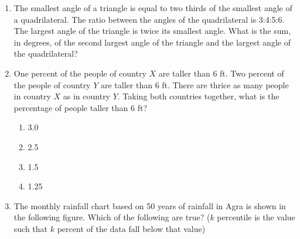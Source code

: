 \documentclass[journal,12pt,onecolumn]{IEEEtran}
\theoremstyle{remark}
\begin{document}
\begin{enumerate}
\item The smallest angle of a triangle is equal to two thirds of the smallest angle of a quadrilateral. The ratio between the angles of the quadrilateral is 3:4:5:6. The largest angle of the triangle is twice its smallest angle. What is the sum, in degrees, of the second largest angle of the triangle and the largest angle of the quadrilateral?

\item One percent of the people of country $X$ are taller than 6 ft. Two percent of the people of country $Y$ are taller than 6 ft. There are thrice as many people in country $X$ as in country $Y$. Taking both countries together, what is the percentage of people taller than 6 ft?
\begin{enumerate}

    \item 3.0
    \item 2.5
    \item 1.5
    \item 1.25
\end{enumerate}

\item The monthly rainfall chart based on 50 years of rainfall in Agra is shown in the following figure. Which of the following are true? ($k$ percentile is the value such that $k$ percent of the data fall below that value)


\pgfplotsset{compat=1.17}


\end{enumerate}
\end{document}
